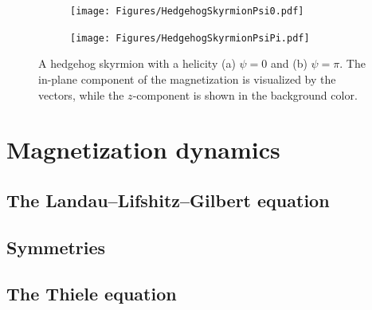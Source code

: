 \documentclass[12pt, a4paper, twoside, openright]{report}
\numberwithin{equation}{chapter}
\numberwithin{figure}{chapter}
\numberwithin{table}{chapter}
\begin{document}
\begin{figure}[h!]
\centering
\begin{subfigure}{.49\textwidth}
  \centering
  \texttt{[image: Figures/HedgehogSkyrmionPsi0.pdf]}
  \caption{}
  \label{fig:HedgehogSkyrmion1}
\end{subfigure}
\begin{subfigure}{.49\textwidth}
  \centering
  \texttt{[image: Figures/HedgehogSkyrmionPsiPi.pdf]}
  \caption{}
  \label{fig:HedgehogSkyrmion2}
\end{subfigure}
\caption{A hedgehog skyrmion with a helicity (a) $\psi = 0$ and (b) $\psi = \pi$. The in-plane component of the magnetization is visualized by the vectors, while the $z$-component is shown in the background color.}
\label{fig:HedgehogSkyrmions}
\end{figure}
\chapter{Magnetization dynamics}
\section{The Landau--Lifshitz--Gilbert equation}
\section{Symmetries}
\section{The Thiele equation}
\end{document}
